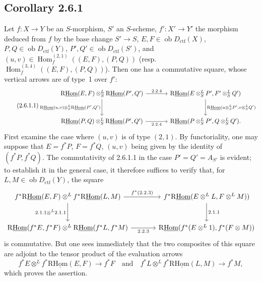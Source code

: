 \documentclass[11pt]{article}
\DeclareMathOperator{\Hom}{Hom}
\newcommand{\ob}{\operatorname{ob}}
\providecommand{\ctf}{\mathrm{ctf}}
\providecommand{\Hom}{\operatorname{Hom}}
\providecommand{\ob}{\operatorname{ob}}
\providecommand{\Hom}{\operatorname{Hom}}
\begin{document}
\subsection*{Corollary 2.6.1}
Let $f:X\to Y$ be an $S$-morphism, $S'$ an $S$-scheme, $f':X'\to Y'$ the morphism deduced from $f$ by the base change $S'\to S$, $E,F\in\ob D_{\ctf}(X)$, $P,Q\in\ob D_{\ctf}(Y)$, $P',Q'\in\ob D_{\ctf}(S')$, and $(u,v)\in\Hom_f^{(2,1)}((E,F),(P,Q))$ (resp. $\Hom_f^{(3,4)}((E,F),(P,Q))$). Then one has a commutative square, whose vertical arrows are of type~1 over $f'$:
\begin{equation}\tag{2.6.1.1}
\begin{tikzcd}[column sep=large,row sep=large]
\mathrm{R}\underline{\mathrm{Hom}}(E,F)\otimes^L_S\mathrm{R}\underline{\mathrm{Hom}}(P',Q') \arrow[r,"2.2.4"] \arrow[d,"{\mathrm{R}\underline{\mathrm{Hom}}(u,v)\otimes^L_S\mathrm{R}\underline{\mathrm{Hom}}(P',Q')}"'] & \mathrm{R}\underline{\mathrm{Hom}}(E\otimes^L_SP',F'\otimes^L_SQ') \arrow[d,"{\mathrm{R}\underline{\mathrm{Hom}}(u\otimes^L_SP',v\otimes^L_SQ')}"]\\
\mathrm{R}\underline{\mathrm{Hom}}(P,Q)\otimes^L_S\mathrm{R}\underline{\mathrm{Hom}}(P',Q') \arrow[r,"2.2.4"'] & \mathrm{R}\underline{\mathrm{Hom}}(P\otimes^L_SP',Q\otimes^L_SQ').
\end{tikzcd}
\end{equation}
First examine the case where $(u,v)$ is of type $(2,1)$. By functoriality, one may suppose that $E=f^{*}P$, $F=f^{*}Q$, $(u,v)$ being given by the identity of $(f^{*}P,f^{*}Q)$. The commutativity of 2.6.1.1 in the case $P'=Q'=A_{S'}$ is evident; to establish it in the general case, it therefore suffices to verify that, for $L,M\in\ob D_{\ctf}(Y)$, the square
\[
\begin{tikzcd}[column sep=large,row sep=large]
f^{*}\mathrm{R}\underline{\mathrm{Hom}}(E,F)\otimes^L f^{*}\mathrm{R}\underline{\mathrm{Hom}}(L,M) \arrow[r,"{f^*(2.2.3)}"] \arrow[d,"{2.1.1\otimes^L 2.1.1}"'] & f^{*}\mathrm{R}\underline{\mathrm{Hom}}(E\otimes^LL,F\otimes^LM)) \arrow[d,"2.1.1"]\\
\mathrm{R}\underline{\mathrm{Hom}}(f^{*}E,f^{*}F)\otimes^L\mathrm{R}\underline{\mathrm{Hom}}(f^{*}L,f^{*}M) \arrow[r,"2.2.3"'] & \mathrm{R}\underline{\mathrm{Hom}}(f^{*}(E\otimes^L1),f^{*}(F\otimes M))
\end{tikzcd}
\]
is commutative. But one sees immediately that the two composites of this square are adjoint to the tensor product of the evaluation arrows
\[
f^{*}E\otimes^L f^{*}\mathrm{R}\underline{\mathrm{Hom}}(E,F)\longrightarrow f^{*}F
\quad\text{and}\quad
f^{*}L\otimes^L f^{*}\mathrm{R}\underline{\mathrm{Hom}}(L,M)\longrightarrow f^{*}M,
\]
which proves the assertion.
\end{document}
